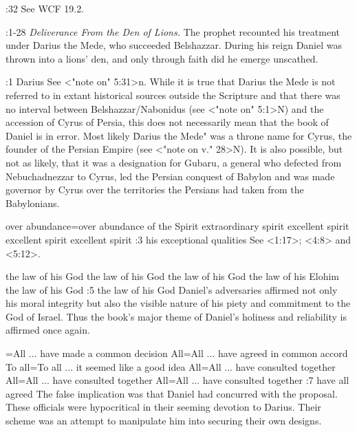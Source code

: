 :32 {}  See WCF 19.2.

:1-28 {} {\it Deliverance From the Den of Lions.\/} The prophet recounted his treatment under Darius the Mede,
who succeeded Belshazzar. During his reign Daniel was thrown into a lions' den, and only 
through faith did he emerge unscathed.

:1 {Darius} See <"note on" 5:31>n. While it is true that Darius the Mede 
is not referred to in extant historical sources outside the Scripture 
and that there was no interval between Belshazzar/Nabonidus (see 
<"note on" 5:1>N) and the accession of Cyrus of Persia, this does not necessarily mean that the book of
Daniel is in error. Most likely \"Darius  the Mede" was a throne name for Cyrus, the founder of the Persian 
Empire (see <"note on v." 28>N). It is also possible, but not as likely, that it 
was a designation for Gubaru, a general who defected from Nebuchadnezzar to Cyrus, led the Persian
conquest of Babylon and was  made governor by Cyrus over the territories the Persians had taken from the Babylonians.

    {over abundance}={over abundance of the Spirit} %
    {extraordinary spirit} %
    {excellent spirit} %
    {excellent spirit} %
    {excellent spirit} %
:3 {his exceptional qualities} See <1:17>; <4:8> and <5:12>.

    {the law of his God} %
    {the law of his God} %
    {the law of his God} %
    {the law of his Elohim} %
    {the law of his God} %
:5 {the law of his God} Daniel's adversaries affirmed not only his 
moral integrity but also the visible nature of his piety and commitment to the God of Israel. Thus
the book's major theme of Daniel's  holiness and reliability is affirmed once again.
 
={All ... have made a common decision} %
    {All}={All ... have agreed in common accord}  %
    {To all}={To all ... it seemed like a good idea}  %
    {All}={All ... have consulted together}  %
    {All}={All ... have consulted together}  %
    {All}={All ... have consulted together}  %
:7 {have all agreed} The false implication was that Daniel had 
concurred with the proposal. These officials were hypocritical in 
their seeming devotion to Darius. Their scheme was an attempt to 
manipulate him into securing their own designs. 


